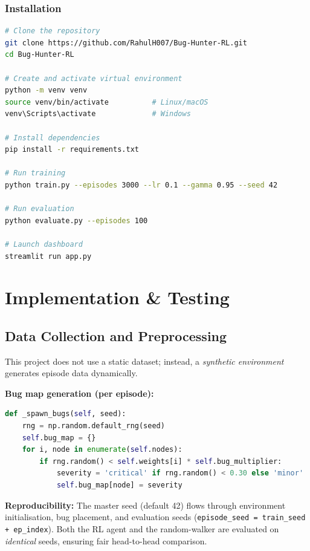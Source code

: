 \documentclass[12pt,a4paper]{report}
\begin{document}
\subsection{Installation}

\begin{lstlisting}[language=sh, caption={Project setup commands.}]
# Clone the repository
git clone https://github.com/RahulH007/Bug-Hunter-RL.git
cd Bug-Hunter-RL

# Create and activate virtual environment
python -m venv venv
source venv/bin/activate          # Linux/macOS
venv\Scripts\activate             # Windows

# Install dependencies
pip install -r requirements.txt

# Run training
python train.py --episodes 3000 --lr 0.1 --gamma 0.95 --seed 42

# Run evaluation
python evaluate.py --episodes 100

# Launch dashboard
streamlit run app.py
\end{lstlisting}

\chapter{Implementation \& Testing}

\section{Data Collection and Preprocessing}

This project does not use a static dataset; instead, a \emph{synthetic
environment} generates episode data dynamically.

\textbf{Bug map generation (per episode):}
\begin{lstlisting}[language=python, caption={Bug spawning in BugHuntingEnv.}]
def _spawn_bugs(self, seed):
    rng = np.random.default_rng(seed)
    self.bug_map = {}
    for i, node in enumerate(self.nodes):
        if rng.random() < self.weights[i] * self.bug_multiplier:
            severity = 'critical' if rng.random() < 0.30 else 'minor'
            self.bug_map[node] = severity
\end{lstlisting}

\textbf{Reproducibility:} The master seed (default 42) flows through
environment initialisation, bug placement, and evaluation seeds
(\texttt{episode\_seed = train\_seed + ep\_index}).  Both the RL agent
and the random-walker are evaluated on \emph{identical} seeds, ensuring
fair head-to-head comparison.
\end{document}
